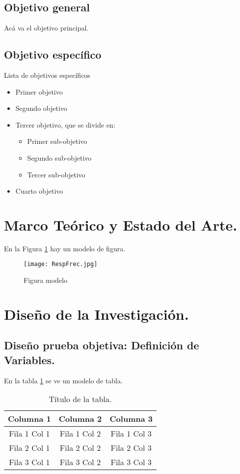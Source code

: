 \subsection{Objetivo general}
Acá va el objetivo principal.\par
\subsection{Objetivo específico}
Lista de objetivos específicos
\begin{itemize}
\item Primer objetivo
\item Segundo objetivo
\item Tercer objetivo, que se divide en:
	\begin{itemize}
		\item Primer sub-objetivo
		\item Segundo sub-objetivo
		\item Tercer sub-objetivo
	\end{itemize}
\item Cuarto objetivo
\end{itemize}

\section{Marco Teórico y Estado del Arte.}
En la Figura \ref{fig:RespFrec} hay un modelo de figura.

\begin{figure}[h]
	\centering
	\texttt{[image: RespFrec.jpg]}
	\caption[RespFrec]{Figura modelo} 
	\label{fig:RespFrec}
\end{figure}

\section{Diseño de la Investigación.}

\subsection{Diseño prueba objetiva: Definición de Variables.}
En la tabla \ref{tab:HRTFangles} se ve un modelo de tabla.

\begin{table}[h]
	\centering
	\caption{Título de la tabla.}
	\begin{tabular}{ccc}
		\hline
		\textbf{Columna 1}&\textbf{Columna 2}&\textbf{Columna 3}\\\hline
		
		Fila 1 Col 1 & Fila 1 Col 2 & Fila 1 Col 3\\\hline
		Fila 2 Col 1 & Fila 2 Col 2 & Fila 2 Col 3\\\hline
		Fila 3 Col 1 & Fila 3 Col 2 & Fila 3 Col 3\\\hline
	\end{tabular}  
	\label{tab:HRTFangles}
\end{table}

